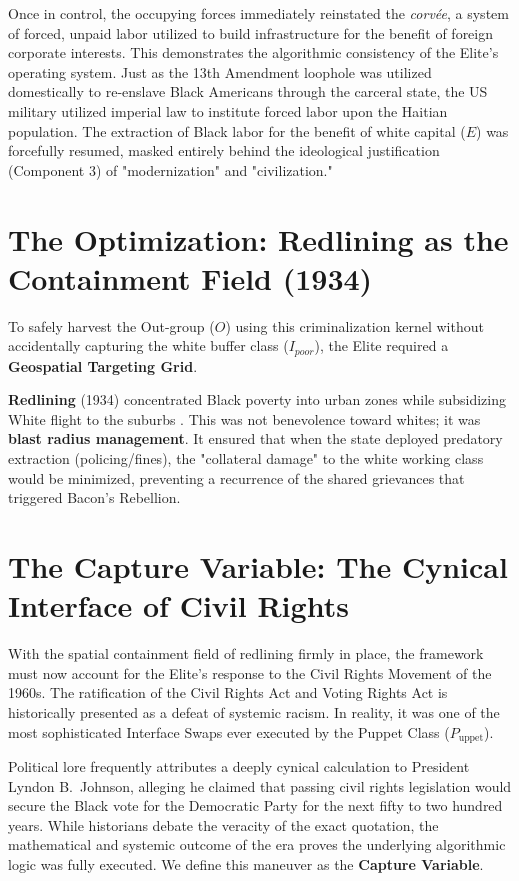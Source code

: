 \documentclass[12pt,openany]{book}
\begin{document}
Once in control, the occupying forces immediately reinstated the \textit{corv\'{e}e}, a system of forced, unpaid labor utilized to build infrastructure for the benefit of foreign corporate interests. This demonstrates the algorithmic consistency of the Elite's operating system. Just as the 13th Amendment loophole was utilized domestically to re-enslave Black Americans through the carceral state, the US military utilized imperial law to institute forced labor upon the Haitian population. The extraction of Black labor for the benefit of white capital ($E$) was forcefully resumed, masked entirely behind the ideological justification (Component 3) of "modernization" and "civilization."

\section{The Optimization: Redlining as the Containment Field (1934)}
To safely harvest the Out-group ($O$) using this criminalization kernel without accidentally capturing the white buffer class ($I_{poor}$), the Elite required a \textbf{Geospatial Targeting Grid}.

\textbf{Redlining} (1934) concentrated Black poverty into urban zones while subsidizing White flight to the suburbs \cite{rothstein, coatesreparations}. This was not benevolence toward whites; it was \textbf{blast radius management}. It ensured that when the state deployed predatory extraction (policing/fines), the "collateral damage" to the white working class would be minimized, preventing a recurrence of the shared grievances that triggered Bacon's Rebellion.

\section{The Capture Variable: The Cynical Interface of Civil Rights}

With the spatial containment field of redlining firmly in place, the framework must now account for the Elite's response to the Civil Rights Movement of the 1960s. The ratification of the Civil Rights Act and Voting Rights Act is historically presented as a defeat of systemic racism. In reality, it was one of the most sophisticated Interface Swaps ever executed by the Puppet Class ($P_{\text{uppet}}$).

Political lore frequently attributes a deeply cynical calculation to President Lyndon B.\ Johnson, alleging he claimed that passing civil rights legislation would secure the Black vote for the Democratic Party for the next fifty to two hundred years. While historians debate the veracity of the exact quotation, the mathematical and systemic outcome of the era proves the underlying algorithmic logic was fully executed. We define this maneuver as the \textbf{Capture Variable}.
\end{document}
